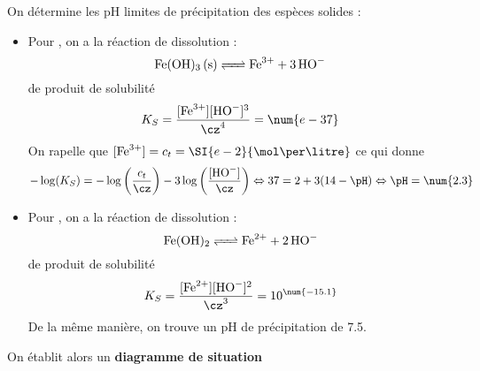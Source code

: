 \documentclass{cours}
\begin{document}
On détermine les pH limites de précipitation des espèces solides :
\begin{itemize}
  \item Pour , on a la réaction de dissolution :
  \begin{equation}
    \ce{Fe(OH)3 (s) <=> Fe^3+ + 3HO-}
  \end{equation}
  de produit de solubilité 
  \begin{equation}
    K_S = \frac{[\ce{Fe^3+}][\ce{HO-}]^3}{\cz^4} = \num{e-37}
  \end{equation}
  On rapelle que $[\ce{Fe^3+}] = c_t = \SI{e-2}{\mol\per\litre}$ ce qui donne
  \begin{equation}
    -\log(K_S) = -\log\left( \frac{c_t}{\cz} \right) -3\log \left( \frac{[\ce{HO-}]}{\cz} \right) \Leftrightarrow 37 = 2 + 3(14-\pH) \Leftrightarrow \pH=\num{2.3}
  \end{equation}

  \item Pour , on a la réaction de dissolution :
  \begin{equation}
    \ce{Fe(OH)2 <=> Fe^2+ + 2HO-}
  \end{equation}
  de produit de solubilité
  \begin{equation}
    K_S = \frac{[\ce{Fe^2+}][\ce{HO-}]^2}{\cz^3}=10^{\num{-15.1}}
  \end{equation}
  De la même manière, on trouve un pH de précipitation de \num{7.5}.
\end{itemize}
On établit alors un \textbf{diagramme de situation} 
\begin{center}
\end{center}
\end{document}
